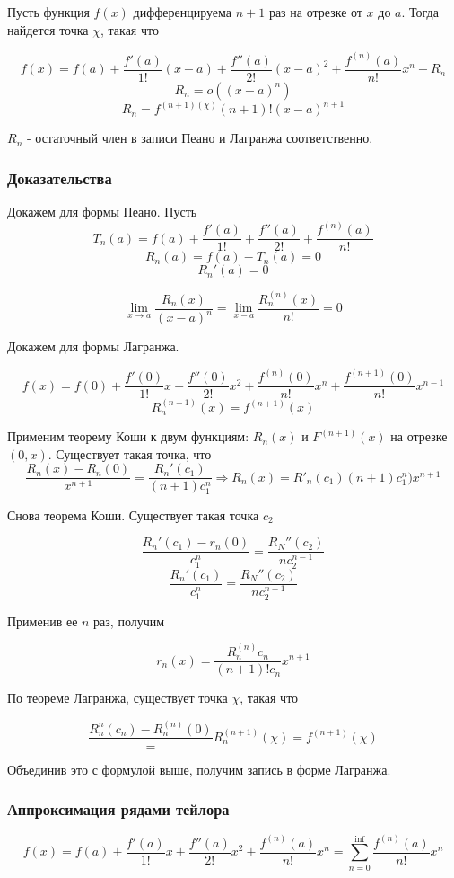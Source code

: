 \documentclass{article}
\begin{document}
Пусть функция $f(x)$ дифференцируема $n+1$ раз на отрезке от $x$ до $a$. Тогда найдется точка $\chi$, такая что 

$$f(x) = f(a) + \frac{f'(a)}{1!}(x-a) + \frac{f''(a)}{2!}(x-a)^2 + \frac{f^(n)(a)}{n!}x^n + R_n$$
$$R_n = o((x-a)^n)$$
$$R_n = f^{(n+1)(\chi)}{(n+1)!}(x-a)^{n+1}$$

$R_n$ - остаточный член в записи Пеано и Лагранжа соответственно.
\subsubsection*{Доказательства}

Докажем для формы Пеано. Пусть 
$$T_n(a) = f(a) + \frac{f'(a)}{1!} + \frac{f''(a)}{2!} + \frac{f^(n)(a)}{n!}$$
$$R_n(a) = f(a) - T_n(a) = 0$$
$$R_n'(a) = 0$$

$$\lim_{x \to a} \frac{R_n(x)}{(x-a)^n} = \lim_{x-a}\frac{R_n^{(n)}(x)}{n!} = 0$$

Докажем для формы Лагранжа.

$$f(x) = f(0) + \frac{f'(0)}{1!}x + \frac{f''(0)}{2!}x^2 + \frac{f^{(n)}(0)}{n!}x^n + \frac{f^{(n+1)}(0)}{n!}x^{n-1}$$
$$R_n^{(n+1)}(x) = f^{(n+1)}(x)$$

Применим теорему Коши к двум функциям: $R_n(x)$ и $F^{(n+1)}(x)$ на отрезке $(0,x)$. Существует такая точка, что 
$$\frac{R_n(x) - R_n(0)}{x^{n+1}} = \frac{R_n'(c_1)}{(n+1)c_1^n} \Rightarrow R_n(x) = R'_n(c_1){(n+1)c_1^n)}x^{n+1}$$

Снова теорема Коши. Существует такая точка $c_2$

$$\frac{R_n'(c_1) - r_n(0)}{c_1^n} = \frac{R_N''(c_2)}{nc_2^{n-1}}$$
$$\frac{R_n'(c_1)}{c_1^n} = \frac{R_N''(c_2)}{nc_2^{n-1}}$$

Применив ее $n$ раз, получим

$$r_n(x) = \frac{R_n^{(n)}c_n}{(n+1)!c_n}x^{n+1}$$

По теореме Лагранжа, существует точка $\chi$, такая что

$$\frac{R_n^{n}(c_n) - R_n^{(n)}(0)} = R_n^{(n+1)}(\chi) = f^{(n+1)}(\chi)$$

Объединив это с формулой выше, получим запись в форме Лагранжа.

\subsubsection*{Аппроксимация рядами тейлора}

$$f(x) = f(a) + \frac{f'(a)}{1!}x + \frac{f''(a)}{2!}x^2 + \frac{f^{(n)}(a)}{n!}x^n = \sum_{n=0}^{\inf} \frac{f^{(n)}(a)}{n!}x^n$$
\end{document}
